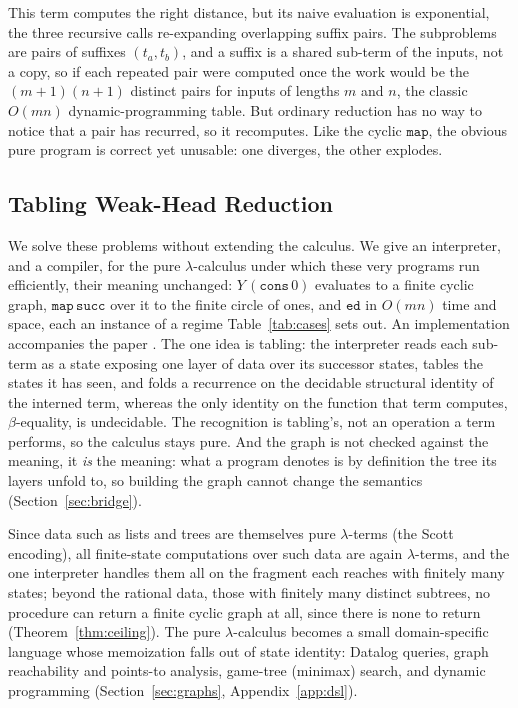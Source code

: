 This term computes the right distance, but its naive evaluation is exponential, the three recursive calls re-expanding overlapping suffix pairs. The subproblems are pairs of suffixes $(t_a,t_b)$, and a suffix is a shared sub-term of the inputs, not a copy, so if each repeated pair were computed once the work would be the $(m{+}1)(n{+}1)$ distinct pairs for inputs of lengths $m$ and $n$, the classic $O(mn)$ dynamic-programming table. But ordinary reduction has no way to notice that a pair has recurred, so it recomputes. Like the cyclic $\mathtt{map}$, the obvious pure program is correct yet unusable: one diverges, the other explodes.

\subsection{Tabling Weak-Head Reduction}

We solve these problems without extending the calculus. We give an interpreter, and a compiler, for the pure $\lambda$-calculus under which these very programs run efficiently, their meaning unchanged: $Y\,(\mathtt{cons}\,0)$ evaluates to a finite cyclic graph, $\mathtt{map}\,\mathtt{succ}$ over it to the finite circle of ones, and $\mathtt{ed}$ in $O(mn)$ time and space, each an instance of a regime Table~\ref{tab:cases} sets out. An implementation accompanies the paper . The one idea is tabling: the interpreter reads each sub-term as a state exposing one layer of data over its successor states, tables the states it has seen, and folds a recurrence on the decidable structural identity of the interned term, whereas the only identity on the function that term computes, $\beta$-equality, is undecidable. The recognition is tabling's, not an operation a term performs, so the calculus stays pure. And the graph is not checked against the meaning, it \emph{is} the meaning: what a program denotes is by definition the tree its layers unfold to, so building the graph cannot change the semantics (Section~\ref{sec:bridge}).

Since data such as lists and trees are themselves pure $\lambda$-terms (the Scott encoding), all finite-state computations over such data are again $\lambda$-terms, and the one interpreter handles them all on the fragment each reaches with finitely many states; beyond the rational data, those with finitely many distinct subtrees, no procedure can return a finite cyclic graph at all, since there is none to return (Theorem~\ref{thm:ceiling}). The pure $\lambda$-calculus becomes a small domain-specific language whose memoization falls out of state identity: Datalog queries, graph reachability and points-to analysis, game-tree (minimax) search, and dynamic programming (Section~\ref{sec:graphs}, Appendix~\ref{app:dsl}).

